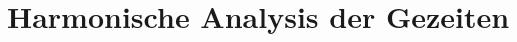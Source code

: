 %
%
%
%
\chapter{Harmonische Analysis der Gezeiten\label{chapter:gezeiten}}
\begin{refsection}








\printbibliography[heading=subbibliography]
\end{refsection}

